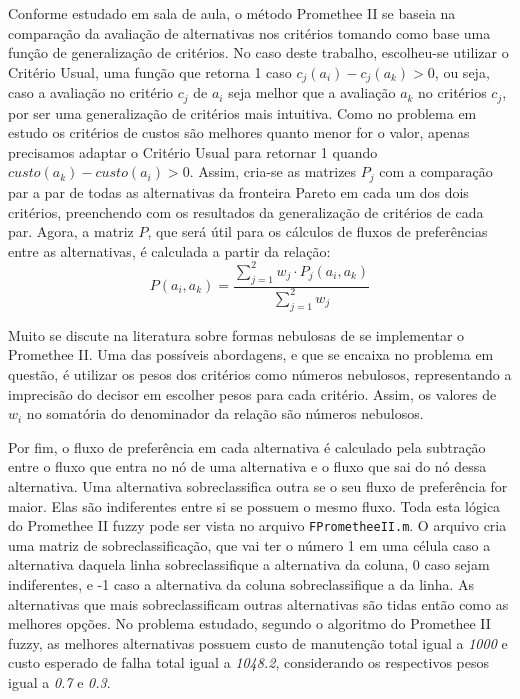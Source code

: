 Conforme estudado em sala de aula, o método Promethee II se baseia na comparação da avaliação de alternativas nos critérios tomando como base uma função de generalização de critérios. No caso deste trabalho, escolheu-se utilizar o Critério Usual, uma função que retorna 1 caso $c_j(a_i) - c_j(a_k) > 0$, ou seja, caso a avaliação no critério $c_j$ de $a_i$ seja melhor que a avaliação $a_k$ no critérios $c_j$, por ser uma generalização de critérios mais intuitiva. Como no problema em estudo os critérios de custos são melhores quanto menor for o valor, apenas precisamos adaptar o Critério Usual para retornar 1 quando $custo(a_k) - custo(a_i) > 0$. Assim, cria-se as matrizes $P_j$ com a comparação par a par de todas as alternativas da fronteira Pareto em cada um dos dois critérios, preenchendo com os resultados da generalização de critérios de cada par. Agora, a matriz $P$, que será útil para os cálculos de fluxos de preferências entre as alternativas, é calculada a partir da relação:
\begin{equation}
P(a_i, a_k) = \frac{\sum_{j=1}^{2} w_j \cdot P_j(a_i, a_k)}{\sum_{j=1}^{2} w_j}
\label{promethee}
\end{equation}

Muito se discute na literatura sobre formas nebulosas de se implementar o Promethee II. Uma das possíveis abordagens, e que se encaixa no problema em questão, é utilizar os pesos dos critérios como números nebulosos, representando a imprecisão do decisor em escolher pesos para cada critério. Assim, os valores de $w_i$ no somatória do denominador da relação são números nebulosos. 

Por fim, o fluxo de preferência em cada alternativa é calculado pela subtração entre o fluxo que entra no nó de uma alternativa e o fluxo que sai do nó dessa alternativa. Uma alternativa sobreclassifica outra se o seu fluxo de preferência for maior. Elas são indiferentes entre si se possuem o mesmo fluxo. Toda esta lógica do Promethee II fuzzy pode ser vista no arquivo \texttt{FPrometheeII.m}. O arquivo cria uma matriz de sobreclassificação, que vai ter o número 1 em uma célula caso a alternativa daquela linha sobreclassifique a alternativa da coluna, 0 caso sejam indiferentes, e -1 caso a alternativa da coluna sobreclassifique a da linha. As alternativas que mais sobreclassificam outras alternativas são tidas então como as melhores opções. No problema estudado, segundo o algoritmo do Promethee II fuzzy, as melhores alternativas possuem custo de manutenção total igual a \textit{1000} e custo esperado de falha total igual a \textit{1048.2}, considerando os respectivos pesos igual a \textit{0.7} e \textit{0.3}.